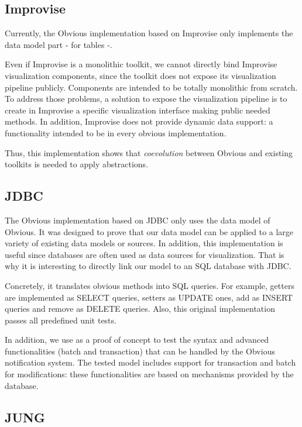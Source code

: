 \subsection{Improvise}

Currently, the Obvious implementation based on Improvise only implements the data model part - for tables -.

Even if Improvise is a monolithic toolkit, we cannot directly bind Improvise visualization components, since the toolkit does not expose its visualization pipeline publicly. Components are intended to be totally monolithic from scratch. To address those problems, a solution to expose the visualization pipeline is to create in Improvise a specific visualization interface making public needed methods. In addition, Improvise does not provide dynamic data support: a functionality intended to be in every obvious implementation.

Thus, this implementation shows that \emph{coevolution} between Obvious and existing toolkits is needed to apply abstractions.

\subsection{JDBC}

The Obvious implementation based on JDBC only uses the data model of Obvious. It was designed to prove that our data model can be applied to a large variety of existing data models or sources. In addition, this implementation is useful since databases are often used as data sources for visualization. That is why it is interesting to directly link our model to an SQL database with JDBC.

Concretely, it  translates obvious methods into SQL queries. For example, getters are implemented as SELECT queries, setters as UPDATE ones, add as INSERT queries and remove as DELETE queries. Also, this original implementation passes all predefined unit tests.

In addition, we use as a proof of concept to test the syntax and advanced functionalities (batch and transaction) that can be handled by the Obvious notification system. The tested model includes support for transaction and batch for modifications: these functionalities are based on mechanisms provided by the database.

\subsection{JUNG}

